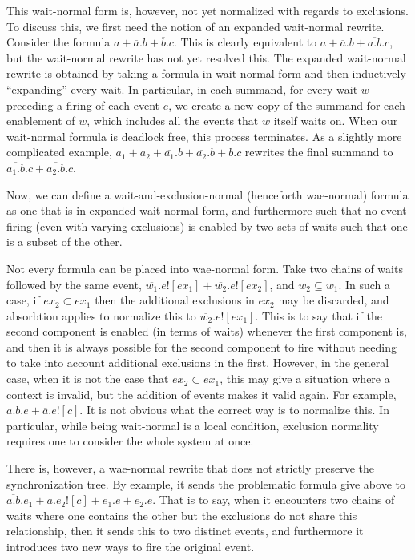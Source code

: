 \documentclass[hoptionsi,review,screen,format=sigconf]{acmart}
\theoremstyle{definition}
\begin{document}
This wait-normal form is, however, not yet normalized with regards to exclusions. To discuss this, we first need the notion of an expanded wait-normal rewrite. Consider the formula \(a + \overline{a}.b + \overline{b}.c\). This is clearly equivalent to \(a + \overline{a}.b + \overline{a.b}.c\), but the wait-normal rewrite has not yet resolved this. The expanded wait-normal rewrite is obtained by taking a formula in wait-normal form and then inductively ``expanding'' every wait. In particular, in each summand, for every wait \(w\) preceding a firing of each event \(e\), we create a new copy of the summand for each enablement of \(w\), which includes all the events that \(w\) itself waits on. When our wait-normal formula is deadlock free, this process terminates. As a slightly more complicated example, \(a_1 + a_2 + \overline{a_1}.b + \overline{a_2}.b + \overline{b}.c \) rewrites the final summand to \(\overline{a_1.b}.c + \overline{a_2.b}.c\).

Now, we can define a wait-and-exclusion-normal (henceforth wae-normal) formula as one that is in expanded wait-normal form, and furthermore such that no event firing (even with varying exclusions) is enabled by two sets of waits such that one is a subset of the other. 

Not every formula can be placed into wae-normal form. Take two chains of waits followed by the same event, \(\overline{w_1}.e![ex_1] + \overline{w_2}.e![ex_2]\), and \(w_2 \subseteq w_1\). In such a case, if \(ex_2 \subset ex_1\) then the additional exclusions in \(ex_2\) may be discarded, and absorbtion applies to normalize this to \(\overline{w_2}.e![ex_1]\). This is to say that if the second component is enabled (in terms of waits) whenever the first component is, and then it is always possible for the second component to fire without needing to take into account additional exclusions in the first. However, in the general case, when it is not the case that \(ex_2 \subset ex_1\),  this may give a situation where a context is invalid, but the addition of events makes it valid again. For example, \( \overline{a.b}.e + \overline{a}.e![c]\). It is not obvious what the correct way is to normalize this. In particular, while being wait-normal is a local condition, exclusion normality requires one to consider the whole system at once.

There is, however, a wae-normal rewrite that does not strictly preserve the synchronization tree. By example, it sends the problematic formula give above to \( \overline{a.b}.e_1 + \overline{a}.e_2![c] + \overline{e_1}.e + \overline{e_2}.e \). That is to say, when it encounters two chains of waits where one contains the other but the exclusions do not share this relationship, then it sends this to two distinct events, and furthermore it introduces two new ways to fire the original event. 
\end{document}
